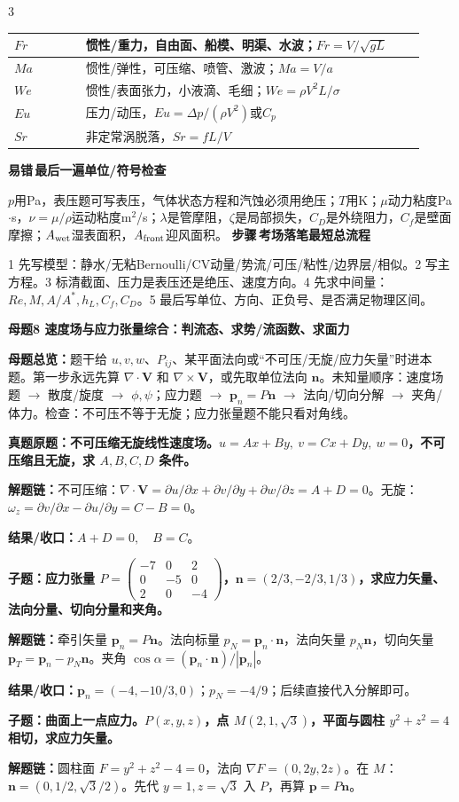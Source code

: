 \documentclass[a4paper]{article}
\newcommand{\mt}[1]{\vspace{0.22pt}\colorbox{M}{\parbox{\dimexpr\linewidth-2\fboxsep}{\color{white}\bfseries #1}}\par}
\newcommand{\qt}[1]{\vspace{0.10pt}\colorbox{Q}{\parbox{\dimexpr\linewidth-2\fboxsep}{\color{white}\bfseries #1}}\par}
\newcommand{\ans}[1]{\colorbox{G}{\parbox{\dimexpr\linewidth-2\fboxsep}{#1}}\par}
\newcommand{\chain}[1]{{\color{A}\bfseries 解题链：}#1\par}
\newcommand{\res}[1]{{\color{E}\bfseries 结果/收口：}#1\par}
\newcommand{\labtag}[3]{{\bfseries\color{#1}\colorbox{#1}{\color{white}\fontsize{2.18}{2.28}\selectfont #2}\,#3}\par}
\newcommand{\step}[1]{\labtag{S}{步骤}{#1}}
\newcommand{\err}[1]{\labtag{R}{易错}{#1}}
\newcommand{\mview}[1]{\ans{\textbf{母题总览：}#1}}
\newcommand{\stepq}[1]{\step{#1}}
\newcommand{\errq}[1]{\err{#1}}
\newenvironment{vfourWrap}{\par\begingroup\fontsize{2.66}{2.80}\selectfont\setlength{\fboxsep}{0.38pt}}{\par\endgroup}
\begin{document}
\begin{multicols}{3}
\begin{vfourWrap}
\begin{tabular}{|p{0.16\linewidth}|p{0.76\linewidth}|}
$Fr$ & 惯性/重力，自由面、船模、明渠、水波；$Fr=V/\sqrt{gL}$\\ \hline
$Ma$ & 惯性/弹性，可压缩、喷管、激波；$Ma=V/a$\\ \hline
$We$ & 惯性/表面张力，小液滴、毛细；$We=\rho V^2L/\sigma$\\ \hline
$Eu$ & 压力/动压，$Eu=\Delta p/(\rho V^2)$或$C_p$\\ \hline
$Sr$ & 非定常涡脱落，$Sr=fL/V$\\ \hline
\end{tabular}
\errq{最后一遍单位/符号检查}
$p$用Pa，表压题可写表压，气体状态方程和汽蚀必须用绝压；$T$用K；$\mu$动力粘度Pa$\cdot$s，$\nu=\mu/\rho$运动粘度m$^2$/s；$\lambda$是管摩阻，$\zeta$是局部损失，$C_D$是外绕阻力，$C_f$是壁面摩擦；$A_{\rm wet}$湿表面积，$A_{\rm front}$迎风面积。
\stepq{考场落笔最短总流程}
1 先写模型：静水/无粘Bernoulli/CV动量/势流/可压/粘性/边界层/相似。2 写主方程。3 标清截面、压力是表压还是绝压、速度方向。4 先求中间量：$Re,M,A/A^*,h_L,C_f,C_D$。5 最后写单位、方向、正负号、是否满足物理区间。
\end{vfourWrap}
\mt{母题8 速度场与应力张量综合：判流态、求势/流函数、求面力}
\mview{题干给 $u,v,w$、$P_{ij}$、某平面法向或“不可压/无旋/应力矢量”时进本题。第一步永远先算 $\nabla\cdot\bm V$ 和 $\nabla\times\bm V$，或先取单位法向 $\bm n$。未知量顺序：速度场题 $\to$ 散度/旋度 $\to$ $\phi,\psi$；应力题 $\to$ $\bm p_n=P\bm n$ $\to$ 法向/切向分解 $\to$ 夹角/体力。检查：不可压不等于无旋；应力张量题不能只看对角线。}
\qt{真题原题：不可压缩无旋线性速度场。$u=Ax+By,\ v=Cx+Dy,\ w=0$，不可压缩且无旋，求 $A,B,C,D$ 条件。}
\chain{不可压缩：$\nabla\cdot\bm V=\partial u/\partial x+\partial v/\partial y+\partial w/\partial z=A+D=0$。无旋：$\omega_z=\partial v/\partial x-\partial u/\partial y=C-B=0$。}
\res{$A+D=0,\quad B=C$。}

\qt{子题：应力张量 $P=\begin{pmatrix}-7&0&2\\0&-5&0\\2&0&-4\end{pmatrix}$，$\bm n=(2/3,-2/3,1/3)$，求应力矢量、法向分量、切向分量和夹角。}
\chain{牵引矢量 $\bm p_n=P\bm n$。法向标量 $p_N=\bm p_n\cdot\bm n$，法向矢量 $p_N\bm n$，切向矢量 $\bm p_T=\bm p_n-p_N\bm n$。夹角 $\cos\alpha=(\bm p_n\cdot\bm n)/|\bm p_n|$。}
\res{$\bm p_n=(-4,-10/3,0)$；$p_N=-4/9$；后续直接代入分解即可。}

\qt{子题：曲面上一点应力。$P(x,y,z)$，点 $M(2,1,\sqrt3)$，平面与圆柱 $y^2+z^2=4$ 相切，求应力矢量。}
\chain{圆柱面 $F=y^2+z^2-4=0$，法向 $\nabla F=(0,2y,2z)$。在 $M$：$\bm n=(0,1/2,\sqrt3/2)$。先代 $y=1,z=\sqrt3$ 入 $P$，再算 $\bm p=P\bm n$。}


\end{multicols}
\end{document}
